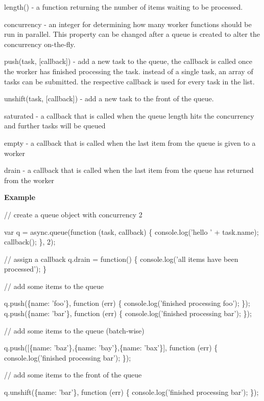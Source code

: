 \begin{DoxyItemize}
\item length() -\/ a function returning the number of items waiting to be processed.
\item concurrency -\/ an integer for determining how many worker functions should be run in parallel. This property can be changed after a queue is created to alter the concurrency on-\/the-\/fly.
\item push(task, \mbox{[}callback\mbox{]}) -\/ add a new task to the queue, the callback is called once the worker has finished processing the task. instead of a single task, an array of tasks can be submitted. the respective callback is used for every task in the list.
\item unshift(task, \mbox{[}callback\mbox{]}) -\/ add a new task to the front of the queue.
\item saturated -\/ a callback that is called when the queue length hits the concurrency and further tasks will be queued
\item empty -\/ a callback that is called when the last item from the queue is given to a worker
\item drain -\/ a callback that is called when the last item from the queue has returned from the worker
\end{DoxyItemize}

{\bfseries Example}


\begin{DoxyCode}
// create a queue object with concurrency 2

var q = async.queue(function (task, callback) \{
    console.log('hello ' + task.name);
    callback();
\}, 2);


// assign a callback
q.drain = function() \{
    console.log('all items have been processed');
\}

// add some items to the queue

q.push(\{name: 'foo'\}, function (err) \{
    console.log('finished processing foo');
\});
q.push(\{name: 'bar'\}, function (err) \{
    console.log('finished processing bar');
\});

// add some items to the queue (batch-wise)

q.push([\{name: 'baz'\},\{name: 'bay'\},\{name: 'bax'\}], function (err) \{
    console.log('finished processing bar');
\});

// add some items to the front of the queue

q.unshift(\{name: 'bar'\}, function (err) \{
    console.log('finished processing bar');
\});
\end{DoxyCode}
 



